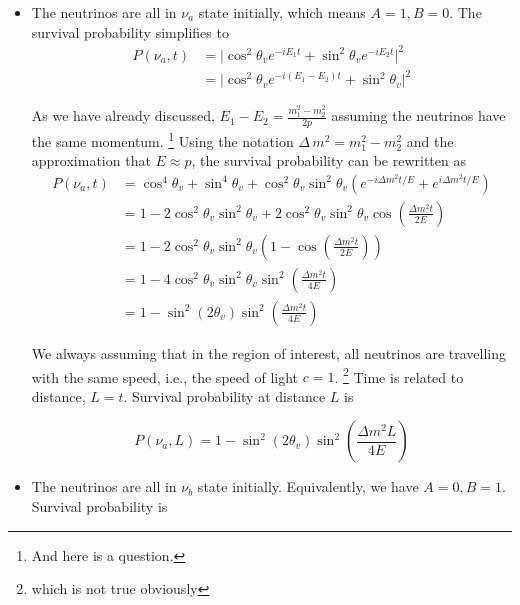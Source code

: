 \documentclass{tufte-handout}
\begin{document}
\begin{itemize}
    \item
    The neutrinos are all in $\nu_a$ state initially, which means $A=1, B=0$. The survival probability simplifies to
    \begin{align*}
    P(\nu_a,t) & = \lvert \cos^2\theta_v e^{-iE_1t} + \sin^2\theta_v e^{-iE_2t} \rvert^2  \\
    & = \lvert \cos^2\theta_v e^{-i(E_1 - E_2) t} + \sin^2\theta_v \rvert^2
    \end{align*}
    
    As we have already discussed, $E_1-E_2 = \frac{m_1^2 - m_2^2}{2p}$ assuming the neutrinos have the same momentum. \footnote{And here is a question.} Using the notation $\Delta \, m^2 = m_1^2 - m_2^2$ and the approximation that $E\approx p$, the survival probability can be rewritten as
    \begin{align*}
    P(\nu_a,t) & = \cos^4\theta_v + \sin^4\theta_v + \cos^2\theta_v \sin^2\theta_v \left( e^{-i \Delta m^2 t/E} + e^{i \Delta m^2 t/E} \right) \\
    & = 1 - 2\cos^2\theta_v \sin^2\theta_v + 2\cos^2\theta_v \sin^2\theta_v \cos\left( \frac{\Delta m^2 t}{2E}\right) \\
    & = 1 - 2\cos^2\theta_v \sin^2\theta_v \left( 1 - \cos\left( \frac{\Delta m^2 t}{2E} \right)  \right) \\
    & = 1 - 4 \cos^2\theta_v \sin^2\theta_v \sin^2 \left( \frac{\Delta m^2 t}{4E} \right) \\
    & = 1 - \sin^2(2\theta_v) \sin^2 \left( \frac{\Delta m^2 t}{4E} \right)
    \end{align*}
    
    
We always assuming that in the region of interest, all neutrinos are travelling with the same speed, i.e., the speed of light $c=1$. \footnote{which is not true obviously} Time is related to distance, $L = t$. Survival probability at distance $L$ is

\begin{equation}
P(\nu_a, L) = 1 -  \sin^2 (2\theta_v) \sin^2 \left( \frac{\Delta m^2 L}{4E} \right)
\end{equation}
    
    \item
    The neutrinos are all in $\nu_b$ state initially. Equivalently, we have $A=0, B = 1$. Survival probability is
    

\end{itemize}
\end{document}
